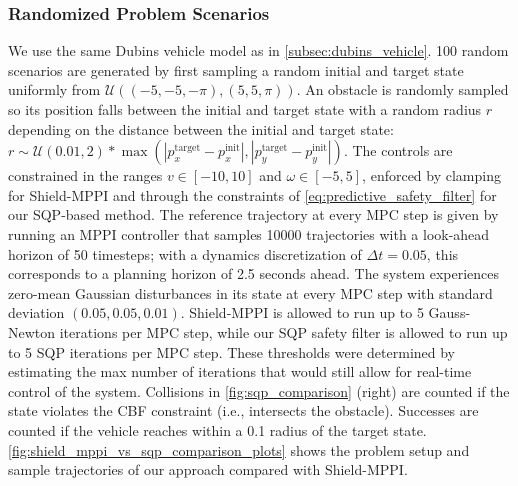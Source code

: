 \documentclass{article} %
\begin{document}
\subsubsection{Randomized Problem Scenarios}

We use the same Dubins vehicle model as in \cref{subsec:dubins_vehicle}. 100 random scenarios are generated by first sampling a random initial and target state uniformly from $\mathcal{U}((-5, -5, -\pi), (5, 5, \pi))$. An obstacle is randomly sampled so its position falls between the initial and target state with a random radius $r$ depending on the distance between the initial and target state: $r \sim \mathcal{U}(0.01, 2) * \max(|p_x^\text{target} - p_x^\text{init}|, |p_y^\text{target} - p_y^\text{init}|)$. The controls are constrained in the ranges $v \in [-10, 10]$ and $\omega \in [-5, 5]$, enforced by clamping for Shield-MPPI and through the constraints of \cref{eq:predictive_safety_filter} for our SQP-based method.
The reference trajectory at every MPC step is given by running an MPPI controller that samples 10000 trajectories with a look-ahead horizon of 50 timesteps; with a dynamics discretization of $\Delta t = 0.05$, this corresponds to a planning horizon of 2.5 seconds ahead. The system experiences zero-mean Gaussian disturbances in its state at every MPC step with standard deviation $(0.05, 0.05, 0.01)$. Shield-MPPI is allowed to run up to 5 Gauss-Newton iterations per MPC step, while our SQP safety filter is allowed to run up to 5 SQP iterations per MPC step. These thresholds were determined by estimating the max number of iterations that would still allow for real-time control of the system.
Collisions in \cref{fig:sqp_comparison} (right) are counted if the state violates the CBF constraint (i.e., intersects the obstacle). Successes are counted if the vehicle reaches within a 0.1 radius of the target state.
\cref{fig:shield_mppi_vs_sqp_comparison_plots} shows the problem setup and sample trajectories of our approach compared with Shield-MPPI.
\end{document}
